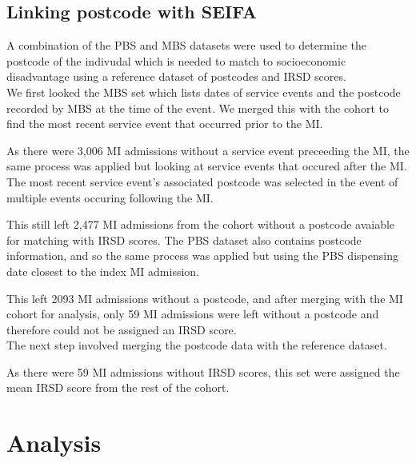 \documentclass[11pt]{article}
\begin{document}
\subsection{Linking postcode with SEIFA}
A combination of the PBS and MBS datasets were used to determine the postcode of the indivudal which is needed to match to socioeconomic disadvantage using a reference dataset of postcodes and IRSD scores. \\
We first looked the MBS set which lists dates of service events and the postcode recorded by MBS at the time of the event. We merged this with the cohort to find the most recent service event that occurred prior to the MI. 
\color{violet}
\begin{stlog}\end{stlog}
\color{black}
As there were 3,006 MI admissions without a service event preceeding the MI, the same process was applied but looking at service events that occured after the MI. The most recent service event's associated postcode was selected in the event of multiple events occuring following the MI. 
\color{violet}
\begin{stlog}\end{stlog}
\color{black}
This still left 2,477 MI admissions from the cohort without a postcode avaiable for matching with IRSD scores. The PBS dataset also contains postcode information, and so the same process was applied but using the PBS dispensing date closest to the index MI admission. 
\color{violet}
\begin{stlog}\end{stlog}
\color{black}
This left 2093 MI admissions without a postcode, and after merging with the MI cohort for analysis, only 59 MI admissions were left without a postcode and therefore could not be assigned an IRSD score. \\
The next step involved merging the postcode data with the reference dataset. 
\color{violet}
\begin{stlog}\end{stlog}
\color{black}
As there were 59 MI admissions without IRSD scores, this set were assigned the mean IRSD score from the rest of the cohort. 
\color{violet}
\begin{stlog}\end{stlog}
\color{black}
\section{Analysis}
\end{document}
